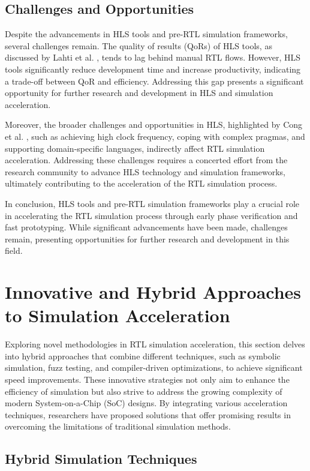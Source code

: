 \documentclass[conference]{IEEEtran}
\begin{document}
\subsection{Challenges and Opportunities}

Despite the advancements in HLS tools and pre-RTL simulation frameworks, several challenges remain. The quality of results (QoRs) of HLS tools, as discussed by Lahti et al. \cite{lahtiAreWeThereYet2019}, tends to lag behind manual RTL flows. However, HLS tools significantly reduce development time and increase productivity, indicating a trade-off between QoR and efficiency. Addressing this gap presents a significant opportunity for further research and development in HLS and simulation acceleration.

Moreover, the broader challenges and opportunities in HLS, highlighted by Cong et al. \cite{congFPGAHLSToday2022b}, such as achieving high clock frequency, coping with complex pragmas, and supporting domain-specific languages, indirectly affect RTL simulation acceleration. Addressing these challenges requires a concerted effort from the research community to advance HLS technology and simulation frameworks, ultimately contributing to the acceleration of the RTL simulation process.

In conclusion, HLS tools and pre-RTL simulation frameworks play a crucial role in accelerating the RTL simulation process through early phase verification and fast prototyping. While significant advancements have been made, challenges remain, presenting opportunities for further research and development in this field.
\section{Innovative and Hybrid Approaches to Simulation Acceleration}

Exploring novel methodologies in RTL simulation acceleration, this section delves into hybrid approaches that combine different techniques, such as symbolic simulation, fuzz testing, and compiler-driven optimizations, to achieve significant speed improvements. These innovative strategies not only aim to enhance the efficiency of simulation but also strive to address the growing complexity of modern System-on-a-Chip (SoC) designs. By integrating various acceleration techniques, researchers have proposed solutions that offer promising results in overcoming the limitations of traditional simulation methods.

\subsection{Hybrid Simulation Techniques}
\end{document}
